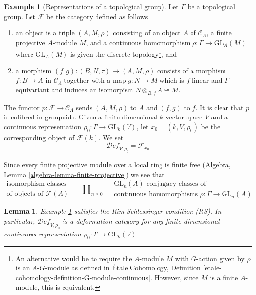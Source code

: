 \documentclass{stacks-project}
\theoremstyle{plain}
\newtheorem{lemma}[subsection]{Lemma}
\theoremstyle{definition}
\newtheorem{example}[subsection]{Example}
\theoremstyle{remark}
\numberwithin{equation}{subsection}
\def\Deformationcategory{\mathcal{D}\!\mathit{ef}}
\begin{document}
\begin{example}[Representations of a topological group]
\label{example-continuous-representations}
Let $\Gamma$ be a topological group.
Let $\mathcal{F}$ be the category defined as follows
\begin{enumerate}
\item an object is a triple $(A, M, \rho)$ consisting of an
object $A$ of $\mathcal{C}_\Lambda$, a finite projective $A$-module $M$,
and a continuous homomorphism $\rho : \Gamma \to \text{GL}_A(M)$
where $\text{GL}_A(M)$ is given the discrete topology\footnote{An alternative
would be to require the $A$-module $M$ with $G$-action given by $\rho$
is an $A\text{-}G$-module as defined in \'Etale Cohomology, Definition
\ref{etale-cohomology-definition-G-module-continuous}. However,
since $M$ is a finite $A$-module, this is equivalent.}, and
\item a morphism $(f, g) : (B, N, \tau) \to (A, M, \rho)$ consists of
a morphism $f : B \to A$ in $\mathcal{C}_\Lambda$ together
with a map $g : N \to M$ which is $f$-linear and $\Gamma$-equivariant
and induces an isomorpism $N \otimes_{B, f} A \cong M$.
\end{enumerate}
The functor $p : \mathcal{F} \to \mathcal{C}_\Lambda$ sends $(A, M, \rho)$
to $A$ and $(f, g)$ to $f$. It is clear that $p$ is cofibred in groupoids.
Given a finite dimensional $k$-vector space $V$ and a
continuous representation $\rho_0 : \Gamma \to \text{GL}_k(V)$,
let $x_0 = (k, V, \rho_0)$ be the corresponding object of $\mathcal{F}(k)$.
We set
$$
\Deformationcategory_{V, \rho_0} = \mathcal{F}_{x_0}
$$
\end{example}

\noindent
Since every finite projective module over a local ring is finite free
(Algebra, Lemma \ref{algebra-lemma-finite-projective})
we see that
$$
\begin{matrix}
\text{isomorphism classes} \\
\text{of objects of }\mathcal{F}(A)
\end{matrix}
=
\coprod\nolimits_{n \geq 0}\quad
\begin{matrix}
\text{GL}_n(A)\text{-conjugacy classes of}\\
\text{continuous homomorphisms }\rho : \Gamma \to \text{GL}_n(A)
\end{matrix}
$$

\begin{lemma}
\label{lemma-continuous-representations-RS}
Example \ref{example-continuous-representations}
satisfies the Rim-Schlessinger condition (RS).
In particular, $\Deformationcategory_{V, \rho_0}$ is a deformation category
for any finite dimensional continuous representation
$\rho_0 : \Gamma \to \text{GL}_k(V)$.
\end{lemma}
\end{document}
